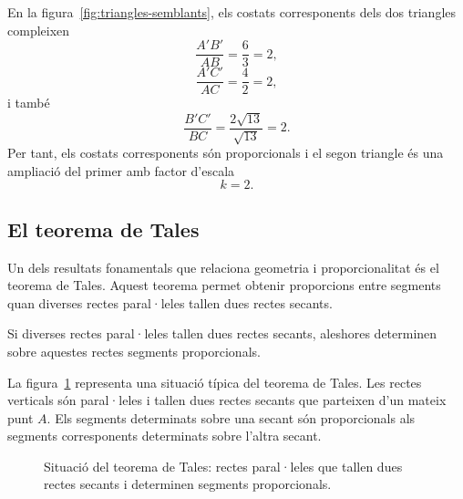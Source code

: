 \begin{exemple}
En la figura~\ref{fig:triangles-semblants}, els costats corresponents dels dos triangles compleixen
\[
	\frac{A'B'}{AB}
	=
	\frac{6}{3}
	=
	2,
\]
\[
	\frac{A'C'}{AC}
	=
	\frac{4}{2}
	=
	2,
\]
i també
\[
	\frac{B'C'}{BC}
	=
	\frac{2\sqrt{13}}{\sqrt{13}}
	=
	2.
\]
Per tant, els costats corresponents són proporcionals i el segon triangle és una ampliació del primer amb factor d'escala
\[
	k=2.
\]
\end{exemple}

\subsection{El teorema de Tales}

Un dels resultats fonamentals que relaciona geometria i proporcionalitat és el teorema de Tales. Aquest teorema permet obtenir proporcions entre segments quan diverses rectes paral·leles tallen dues rectes secants.

\begin{proposicio}
Si diverses rectes paral·leles tallen dues rectes secants, aleshores determinen sobre aquestes rectes segments proporcionals.
\end{proposicio}

La figura~\ref{fig:tales} representa una situació típica del teorema de Tales. Les rectes verticals són paral·leles i tallen dues rectes secants que parteixen d'un mateix punt \(A\). Els segments determinats sobre una secant són proporcionals als segments corresponents determinats sobre l'altra secant.

\begin{figure}[htbp]
\centering
{}
\caption{Situació del teorema de Tales: rectes paral·leles que tallen dues rectes secants i determinen segments proporcionals.}
\label{fig:tales}
\end{figure}

